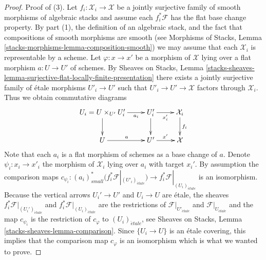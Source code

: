 \documentclass[10pt,a4paper]{amsart}
\theoremstyle{plain}
\theoremstyle{definition}
\theoremstyle{remark}
\numberwithin{equation}{subsection}
\def\etale{{\acute{e}tale}}
\begin{document}
\begin{proof}
\medskip\noindent
Proof of (3).
Let $f_i : \mathcal{X}_i \to \mathcal{X}$ be a jointly surjective family of
smooth morphisms of algebraic stacks and assume each $f_i^*\mathcal{F}$
has the flat base change property. By part (1), the definition of
an algebraic stack, and the fact that compositions of smooth morphisms
are smooth (see
Morphisms of Stacks, Lemma \ref{stacks-morphisms-lemma-composition-smooth})
we may assume that each $\mathcal{X}_i$ is representable by a scheme.
Let $\varphi : x \to x'$ be a morphism of $\mathcal{X}$ lying over
a flat morphism $a : U \to U'$ of schemes. By
Sheaves on Stacks, Lemma
\ref{stacks-sheaves-lemma-surjective-flat-locally-finite-presentation}
there exists a jointly surjective family of \'etale morphisms
$U'_i \to U'$ such that $U'_i \to U' \to \mathcal{X}$ factors through
$\mathcal{X}_i$. Thus we obtain commutative diagrams
$$
\xymatrix{
U_i = U \times_{U'} U_i' \ar[r]_-{a_i} \ar[d] &
U_i' \ar[r]_{x_i'} \ar[d] & \mathcal{X}_i \ar[d]^{f_i} \\
U \ar[r]^a & U' \ar[r]^{x'} & \mathcal{X}
}
$$
Note that each $a_i$ is a flat morphism of schemes as a base change of $a$.
Denote $\psi_i : x_i \to x'_i$ the morphism of $\mathcal{X}_i$ lying over
$a_i$ with target $x_i'$. By assumption the comparison maps
$c_{\psi_i} :
(a_i)_{small}^*\big(f_i^*\mathcal{F}|_{(U'_i)_\etale}\big)
\to f_i^*\mathcal{F}|_{(U_i)_\etale}$ is an isomorphism.
Because the vertical arrows $U_i' \to U'$ and $U_i \to U$ are \'etale,
the sheaves $f_i^*\mathcal{F}|_{(U_i')_\etale}$ and
$f_i^*\mathcal{F}|_{(U_i)_\etale}$ are the restrictions of
$\mathcal{F}|_{U'_\etale}$ and $\mathcal{F}|_{U_\etale}$
and the map $c_{\psi_i}$ is the restriction of $c_\varphi$ to
$(U_i)_\etale$, see
Sheaves on Stacks, Lemma \ref{stacks-sheaves-lemma-comparison}.
Since $\{U_i \to U\}$ is an \'etale covering, this implies
that the comparison map $c_\varphi$ is an isomorphism which is what
we wanted to prove.


\end{proof}
\end{document}
